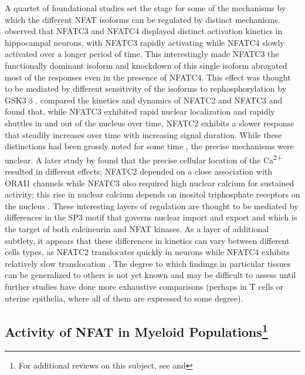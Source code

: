 A quartet of foundational studies set the stage for some of the mechanisms by which the different NFAT isoforms can be regulated by distinct mechanisms. \citet{Ulrich2012} observed that NFATC3 and NFATC4 displayed distinct activation kinetics in hippocampal neurons, with NFATC3 rapidly activating while NFATC4 slowly activated over a longer period of time. This interestingly made NFATC3 the functionally dominant isoform and knockdown of this single isoform abrogated most of the responses even in the presence of NFATC4. This effect was thought to be mediated by different sensitivity of the isoforms to rephosphorylation by GSK3$\upbeta$. \citet{Yissachar2013} compared the kinetics and dynamics of NFATC2 and NFATC3 and found that, while NFATC3 exhibited rapid nuclear localization and rapidly shuttles in and out of the nucleus over time, NFATC2 exhibits a slower response that steadily increases over time with increasing signal duration. While these distinctions had been grossly noted for some time \citep{Chow1997, Rinne2009}, the precise mechanisms were unclear. A later study by \citet{Kar2015} found that the precise cellular location of the Ca\textsuperscript{2+} resulted in different effects; NFATC2 depended on a close association with ORAI1 channels while NFATC3 also required high nuclear calcium for sustained activity; this rise in nuclear calcium depends on inositol triphosphate receptors on the nucleus \citep{Kar2016}. These interesting layers of regulation are thought to be mediated by differences in the SP3 motif that governs nuclear import and export and which is the target of both calcineurin and NFAT kinases. As a layer of additional subtlety, it appears that these differences in kinetics can vary between different cells types, as NFATC2 translocates quickly in neurons while NFATC4 exhibits relatively slow translocation \citep{Vihma2016}. The degree to which findings in particular tissues can be generalized to others is not yet known and may be difficult to assess until further studies have done more exhaustive comparisons (perhaps in T cells or uterine epithelia, where all of them are expressed to some degree). 

\subsection[Activity of NFAT in Myeloid Populations]{Activity of NFAT in Myeloid Populations\footnote{For additional reviews on this subject, see  and }}\label{myeloidnfat}

